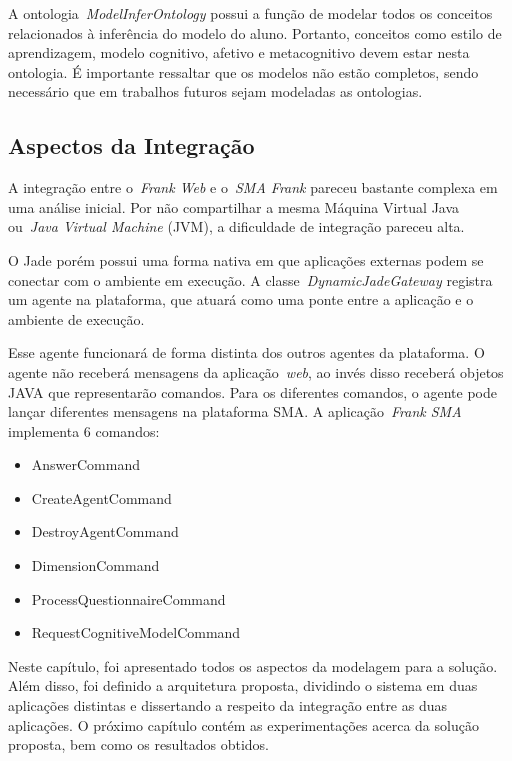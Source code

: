 A ontologia~\emph{ModelInferOntology} possui a função de modelar todos os conceitos relacionados à inferência do modelo do aluno. Portanto, conceitos como estilo de aprendizagem, modelo cognitivo, afetivo e metacognitivo devem estar nesta ontologia. É importante ressaltar que os modelos não estão completos, sendo necessário que em trabalhos futuros sejam modeladas as ontologias.

\subsection{Aspectos da Integração}

A integração entre o~\emph{Frank Web} e o~\emph{SMA Frank} pareceu bastante complexa em uma análise inicial. Por não compartilhar a mesma Máquina Virtual Java ou~\emph{Java Virtual Machine} (JVM), a dificuldade de integração pareceu alta.

O Jade porém possui uma forma nativa em que aplicações externas podem se conectar com o ambiente em execução. A classe~\emph{DynamicJadeGateway} registra um agente na plataforma, que atuará como uma ponte entre a aplicação e o ambiente de execução.

Esse agente funcionará de forma distinta dos outros agentes da plataforma. O agente não receberá mensagens da aplicação~\emph{web}, ao invés disso receberá objetos JAVA que representarão comandos. Para os diferentes comandos, o agente pode lançar diferentes mensagens na plataforma SMA. A aplicação~\emph{Frank SMA} implementa 6 comandos:

\begin{itemize}
	\item AnswerCommand
	\item CreateAgentCommand
	\item DestroyAgentCommand
	\item DimensionCommand
	\item ProcessQuestionnaireCommand
	\item RequestCognitiveModelCommand
\end{itemize}

Neste capítulo, foi apresentado todos os aspectos da modelagem para a solução. Além disso, foi definido a arquitetura proposta, dividindo o sistema em duas aplicações distintas e dissertando a respeito da integração entre as duas aplicações. O próximo capítulo contém as experimentações acerca da solução proposta, bem como os resultados obtidos.























